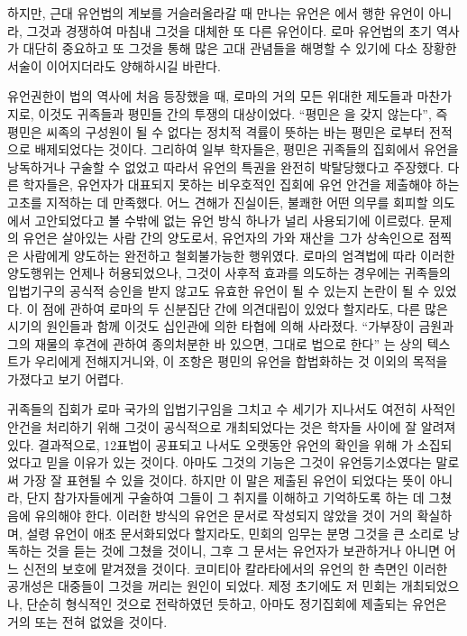 하지만,
근대 유언법의 계보를 거슬러올라갈 때 만나는 유언은
에서 행한 유언이 아니라,
그것과 경쟁하여 마침내 그것을 대체한 또 다른 유언이다.
로마 유언법의 초기 역사가 대단히 중요하고
또 그것을 통해 많은 고대 관념들을 해명할 수 있기에
다소 장황한 서술이 이어지더라도 양해하시길 바란다.

유언권한이 법의 역사에 처음 등장했을 때,
로마의 거의 모든 위대한 제도들과 마찬가지로,
이것도 귀족들과 평민들 간의 투쟁의 대상이었다.
``평민은 을 갖지 않는다'',
즉 평민은 씨족의 구성원이 될 수 없다는 정치적 격률이 뜻하는 바는
평민은 로부터 전적으로 배제되었다는 것이다. %
그리하여 일부 학자들은, 평민은 귀족들의 집회에서 유언을
낭독하거나 구술할 수 없었고
따라서 유언의 특권을 완전히 박탈당했다고 주장했다.
다른 학자들은, 유언자가 대표되지 못하는 비우호적인 집회에
유언 안건을 제출해야 하는 고초를 지적하는 데 만족했다.
어느 견해가 진실이든,
불쾌한 어떤 의무를 회피할 의도에서 고안되었다고 볼 수밖에 없는
유언 방식 하나가 널리 사용되기에 이르렀다.
문제의 유언은 살아있는 사람 간의 양도로서,
유언자의 가와 재산을 그가 상속인으로 점찍은 사람에게 양도하는
완전하고 철회불가능한 행위였다.
로마의 엄격법에 따라 이러한 양도행위는 언제나 허용되었으나,
그것이 사후적 효과를 의도하는 경우에는
귀족들의 입법기구의 공식적 승인을 받지 않고도 유효한 유언이 될 수 있는지
논란이 될 수 있었다.
이 점에 관하여 로마의 두 신분집단 간에 의견대립이 있었다 할지라도,
다른 많은 시기의 원인들과 함께
이것도 십인관에 의한
타협에 의해 사라졌다.
``가부장이 금원과 그의 재물의 후견에 관하여 종의처분한 바
있으면, 그대로 법으로 한다''%
는
상의 텍스트가 우리에게 전해지거니와,
이 조항은
평민의 유언을 합법화하는 것 이외의 목적을 가졌다고 보기 어렵다.

귀족들의 집회가 로마 국가의 입법기구임을 그치고 수 세기가 지나서도
여전히 사적인 안건을 처리하기 위해 그것이 공식적으로 개최되었다는 것은
학자들 사이에 잘 알려져 있다.
결과적으로, 12표법이 공표되고 나서도 오랫동안
유언의 확인을 위해 가 소집되었다고 믿을 이유가 있는 것이다.
아마도 그것의 기능은
그것이 유언등기소였다는
말로써 가장 잘 표현될 수 있을 것이다.
하지만 이 말은 제출된 유언이 되었다는
뜻이 아니라,
단지 참가자들에게 구술하여 그들이 그 취지를 이해하고 기억하도록 하는 데
그쳤음에 유의해야 한다.
이러한 방식의 유언은 문서로 작성되지 않았을 것이 거의 확실하며,
설령 유언이 애초 문서화되었다 할지라도, 민회의 임무는 분명
그것을 큰 소리로 낭독하는 것을 듣는 것에 그쳤을 것이니,
그후 그 문서는 유언자가 보관하거나 아니면
어느 신전의 보호에 맡겨졌을 것이다.
코미티아 칼라타에서의 유언의 한 측면인
이러한 공개성은 대중들이 그것을 꺼리는 원인이 되었다.
제정 초기에도 저 민회는 개최되었으나,
단순히 형식적인 것으로 전락하였던 듯하고, 아마도
정기집회에 제출되는 유언은 거의 또는 전혀 없었을 것이다.


